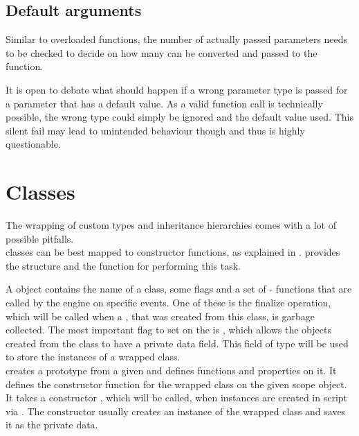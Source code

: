 \subsection{Default arguments}

Similar to overloaded functions, the number of actually passed parameters needs to be checked to decide on how many can be converted and passed to the  function.

It is open to debate what should happen if a wrong parameter type is passed for a parameter that has a default value. As a valid function call is technically possible, the wrong type could simply be ignored and the default value used. This silent fail may lead to unintended behaviour though and thus is highly questionable.

\section{Classes}
\label{sec:StructsAndClasses}

The wrapping of custom types and inheritance hierarchies comes with a lot of possible pitfalls.\\
 classes can be best mapped to  constructor functions, as explained in .  provides the structure  and the function  for performing this task.

A  object contains the name of a class, some flags and a set of  - functions that are called by the  engine on specific events. One of these  is the finalize operation, which will be called when a , that was created from this class, is garbage collected. The most important flag to set on the  is , which allows the objects created from the class to have a private data field. This field of type  will be used to store the instances of a wrapped  class.\\
 creates a prototype  from a given  and defines functions and properties on it. It defines the  constructor function for the wrapped class on the given scope object. It takes a constructor , which will be called, when instances are created in script via . The constructor usually creates an instance of the wrapped  class and saves it as the private data.

